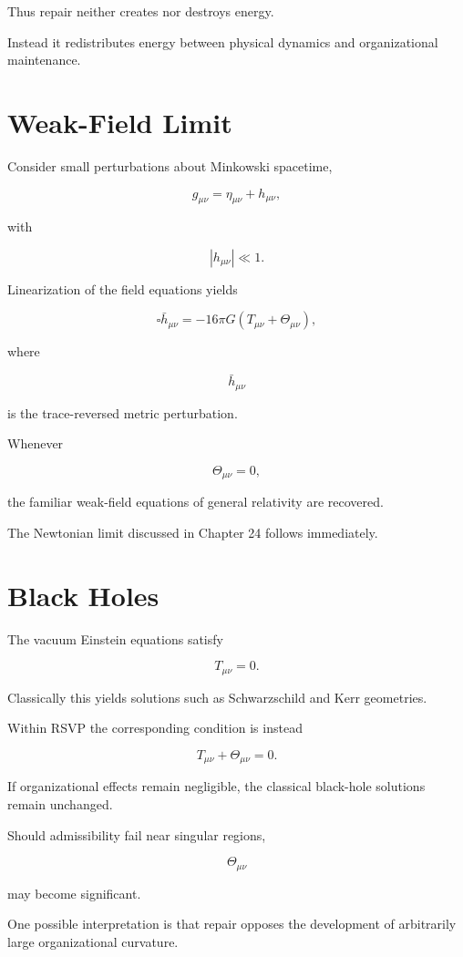 \documentclass[11pt,oneside]{book}
\numberwithin{equation}{chapter}
\theoremstyle{definition}
\theoremstyle{plain}
\begin{document}
Thus repair neither creates nor destroys energy.

Instead it redistributes energy between physical dynamics and organizational
maintenance.

\section{Weak-Field Limit}

Consider small perturbations about Minkowski spacetime,

\[
g_{\mu\nu}
=
\eta_{\mu\nu}
+
h_{\mu\nu},
\]

with

\[
|h_{\mu\nu}|
\ll
1.
\]

Linearization of the field equations yields

\[
\square
\bar h_{\mu\nu}
=
-16\pi G
\left(
T_{\mu\nu}
+
\Theta_{\mu\nu}
\right),
\]

where

\[
\bar h_{\mu\nu}
\]

is the trace-reversed metric perturbation.

Whenever

\[
\Theta_{\mu\nu}=0,
\]

the familiar weak-field equations of general relativity are recovered.

The Newtonian limit discussed in Chapter 24 follows immediately.

\section{Black Holes}

The vacuum Einstein equations satisfy

\[
T_{\mu\nu}=0.
\]

Classically this yields solutions such as Schwarzschild and Kerr geometries.

Within RSVP the corresponding condition is instead

\[
T_{\mu\nu}
+
\Theta_{\mu\nu}
=
0.
\]

If organizational effects remain negligible, the classical black-hole
solutions remain unchanged.

Should admissibility fail near singular regions,

\[
\Theta_{\mu\nu}
\]

may become significant.

One possible interpretation is that repair opposes the development of
arbitrarily large organizational curvature.
\end{document}
